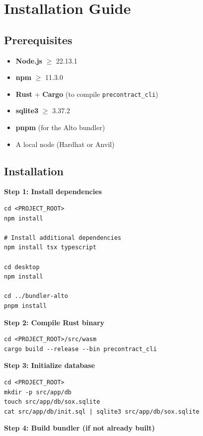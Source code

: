 \section{Installation Guide}

\subsection{Prerequisites}

\begin{itemize}
  \item \textbf{Node.js} $\geq$ 22.13.1
  \item \textbf{npm} $\geq$ 11.3.0
  \item \textbf{Rust} + \textbf{Cargo} (to compile \texttt{precontract\_cli})
  \item \textbf{sqlite3} $\geq$ 3.37.2
  \item \textbf{pnpm} (for the Alto bundler)
  \item A local node (Hardhat or Anvil)
\end{itemize}

\subsection{Installation}

\textbf{Step 1: Install dependencies}

\begin{verbatim}
cd <PROJECT_ROOT>
npm install

# Install additional dependencies
npm install tsx typescript

cd desktop
npm install

cd ../bundler-alto
pnpm install
\end{verbatim}

\textbf{Step 2: Compile Rust binary}

\begin{verbatim}
cd <PROJECT_ROOT>/src/wasm
cargo build --release --bin precontract_cli
\end{verbatim}

\textbf{Step 3: Initialize database}

\begin{verbatim}
cd <PROJECT_ROOT>
mkdir -p src/app/db
touch src/app/db/sox.sqlite
cat src/app/db/init.sql | sqlite3 src/app/db/sox.sqlite
\end{verbatim}

\textbf{Step 4: Build bundler (if not already built)}

